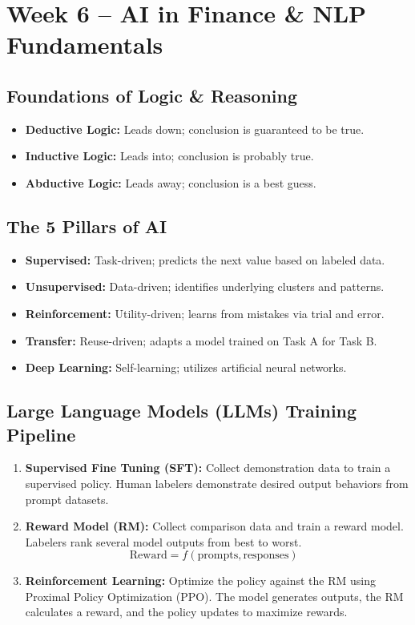 \section{Week 6 -- AI in Finance \& NLP Fundamentals}

\subsection{Foundations of Logic \& Reasoning}
\begin{itemize}
    \item \textbf{Deductive Logic:} Leads down; conclusion is guaranteed to be true.
    \item \textbf{Inductive Logic:} Leads into; conclusion is probably true.
    \item \textbf{Abductive Logic:} Leads away; conclusion is a best guess.
\end{itemize}

\subsection{The 5 Pillars of AI}
\begin{itemize}
    \item \textbf{Supervised:} Task-driven; predicts the next value based on labeled data.
    \item \textbf{Unsupervised:} Data-driven; identifies underlying clusters and patterns.
    \item \textbf{Reinforcement:} Utility-driven; learns from mistakes via trial and error.
    \item \textbf{Transfer:} Reuse-driven; adapts a model trained on Task A for Task B.
    \item \textbf{Deep Learning:} Self-learning; utilizes artificial neural networks.
\end{itemize}

\subsection{Large Language Models (LLMs) Training Pipeline}
\begin{enumerate}
    \item \textbf{Supervised Fine Tuning (SFT):} Collect demonstration data to train a supervised
          policy. Human labelers demonstrate desired output behaviors from prompt
          datasets.
    \item \textbf{Reward Model (RM):} Collect comparison data and train a reward model. Labelers
          rank several model outputs from best to worst.
          \begin{equation*}
              \text{Reward} = f(\text{prompts}, \text{responses}) \text{ }
          \end{equation*}
    \item \textbf{Reinforcement Learning:} Optimize the policy against the RM using Proximal
          Policy Optimization (PPO). The model generates outputs, the RM calculates a
          reward, and the policy updates to maximize rewards.
\end{enumerate}

